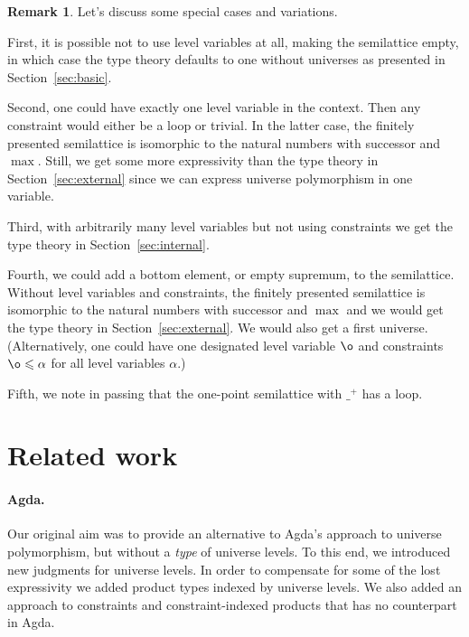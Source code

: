 \documentclass[11pt,a4paper]{article}
\theoremstyle{definition}
\newtheorem{remark}{Remark}
\begin{document}


\begin{remark}
Let's discuss some special cases and variations.

First, it is possible not to use
level variables at all, making the semilattice empty,
in which case the type theory defaults to one without universes
as presented in Section~\ref{sec:basic}.

Second, one could have exactly one level variable in the context.
Then any constraint would either be a loop or trivial.
In the latter case, the finitely presented semilattice
is isomorphic to the natural numbers with successor and $\max$.
Still, we get some more
expressivity than the type theory in Section~\ref{sec:external} since
we can express universe polymorphism in one variable.

Third, with arbitrarily many level variables but not using constraints
we get the type theory in Section~\ref{sec:internal}.

Fourth, we could add a bottom element, or empty supremum, to the semilattice.
Without level variables and constraints, the finitely presented semilattice
is isomorphic to the natural numbers with successor and $\max$
and we would get the type theory in Section~\ref{sec:external}.
We would also get a first universe.
(Alternatively, one could have one designated level variable
$\o$ and constraints $\o\leqslant\alpha$
for all level variables $\alpha$.)

Fifth, we note in passing that the one-point semilattice
with $\_^+$ has a loop.
\end{remark}

\section{Related work}\label{sec:related}

\paragraph{Agda.} Our original aim was to provide an alternative to Agda's approach to universe polymorphism, but without a {\em type} of universe levels. To this end, we introduced new judgments for universe levels. In order to compensate for some of the lost expressivity we added product types indexed by universe levels. We also added an approach to constraints and constraint-indexed products that has no counterpart in Agda.
\end{document}
